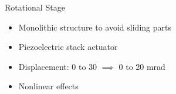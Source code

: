 \documentclass[10pt]{beamer}
\begin{document}
\begin{frame}{Rotational Stage}
  \begin{itemize}
    \item Monolithic structure to avoid sliding parts
    \item Piezoelectric stack actuator
    \item Displacement: 0 to \unit{30}{\micro\meter} $\implies$ 0 to 20 mrad
    \item Nonlinear effects
  \end{itemize}

  \begin{figure}[h!]
    \centering %
    \qquad
  \end{figure}
\end{frame}
\end{document}
